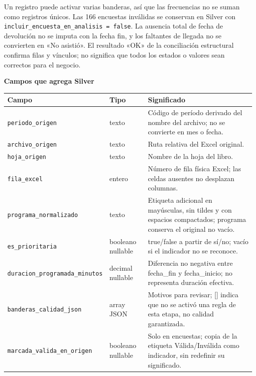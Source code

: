 \documentclass[11pt,letterpaper]{article}
\begin{document}
Un registro puede activar varias banderas, así que las frecuencias no se suman como registros únicos. Las 166 encuestas inválidas se conservan en Silver con \texttt{incluir\_\allowbreak{}encuesta\_\allowbreak{}en\_\allowbreak{}analisis = false}. La ausencia total de fecha de devolución no se imputa con la fecha fin, y los faltantes de llegada no se convierten en «No asistió». El resultado «OK» de la conciliación estructural confirma filas y vínculos; no significa que todos los estados o valores sean correctos para el negocio.

\textbf{Campos que agrega Silver}

\begingroup\small\setlength{\tabcolsep}{4pt}\renewcommand{\arraystretch}{1.15}
\begin{longtable}{>{\raggedright\arraybackslash}p{}>{\raggedright\arraybackslash}p{}>{\raggedright\arraybackslash}p{}}
\toprule
\textbf{Campo} & \textbf{Tipo} & \textbf{Significado} \\
\midrule
\endhead
\texttt{periodo\_\allowbreak{}origen} & texto & Código de período derivado del nombre del archivo; no se convierte en mes o fecha. \\
\texttt{archivo\_\allowbreak{}origen} & texto & Ruta relativa del Excel original. \\
\texttt{hoja\_\allowbreak{}origen} & texto & Nombre de la hoja del libro. \\
\texttt{fila\_\allowbreak{}excel} & entero & Número de fila física Excel; las celdas ausentes no desplazan columnas. \\
\texttt{programa\_\allowbreak{}normalizado} & texto & Etiqueta adicional en mayúsculas, sin tildes y con espacios compactados; programa conserva el original no vacío. \\
\texttt{es\_\allowbreak{}prioritaria} & booleano nullable & true/false a partir de sí/no; vacío si el indicador no se reconoce. \\
\texttt{duracion\_\allowbreak{}programada\_\allowbreak{}minutos} & decimal nullable & Diferencia no negativa entre fecha\_fin y fecha\_inicio; no representa duración efectiva. \\
\texttt{banderas\_\allowbreak{}calidad\_\allowbreak{}json} & array JSON & Motivos para revisar; [] indica que no se activó una regla de esta etapa, no calidad garantizada. \\
\texttt{marcada\_\allowbreak{}valida\_\allowbreak{}en\_\allowbreak{}origen} & booleano nullable & Solo en encuestas; copia de la etiqueta Válida/Inválida como indicador, sin redefinir su significado. \\

\end{longtable}
\end{document}
